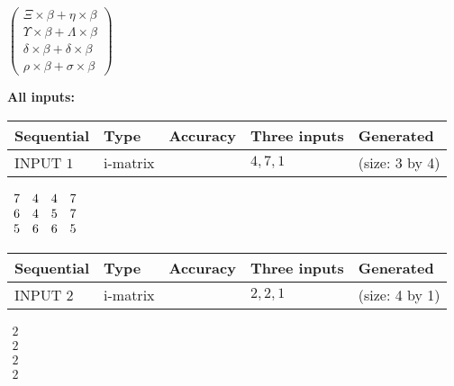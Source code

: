\documentclass[12pt]{article}
\begin{document}
   
 $   \left( \begin{array}
 {
 c
 }
                    \Xi \times  \beta   +  \eta \times  \beta \\ 
 \Upsilon \times  \beta   +  \Lambda \times  \beta \\ 
 \delta \times  \beta   +  \delta \times  \beta \\ 
 \rho \times  \beta   +  \sigma \times  \beta
 \end{array} \right) $ 
   
   
\noindent\vspace{0.1in}\hspace{-0.08in} {\textbf{\Large{All inputs: }}}
   
   
  
  
\noindent\begin{tabular}{|l|l|l|l|l|}
\hline
 Sequential & Type & Accuracy & Three inputs & Generated \\ 
\hline
 
 
  INPUT $           1$ & i-matrix &  & $
 4
 , 
 7
 , 
 1
 $ & (size:           3 by           4)
 \\  \hline  
 \end{tabular}
   
   
 $\begin{array}{
 c
 c
 c
 c
 }
           7 & 
           4 & 
           4 & 
           7 \\ 
           6 & 
           4 & 
           5 & 
           7 \\ 
           5 & 
           6 & 
           6 & 
           5
\end{array}  $ 
  
  
\noindent\begin{tabular}{|l|l|l|l|l|}
\hline
 Sequential & Type & Accuracy & Three inputs & Generated \\ 
\hline
 
 
  INPUT $           2$ & i-matrix &  & $
 2
 , 
 2
 , 
 1
 $ & (size:           4 by           1)
 \\  \hline  
 \end{tabular}
   
   
 $\begin{array}{
 c
 }
           2 \\ 
           2 \\ 
           2 \\ 
           2
\end{array}  $ 
  
\end{document}

